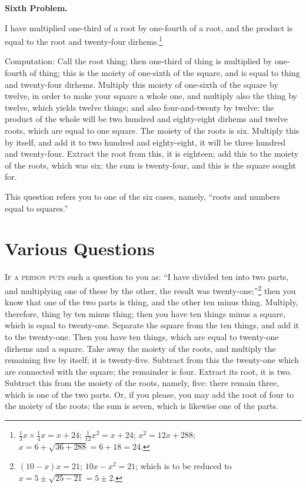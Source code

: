 \vspace{0.3cm}
\noindent\textbf{Sixth Problem.}

I have multiplied one-third of a root by one-fourth of a root, and the product is equal to the root and twenty-four dirhems.\footnote{$\frac{1}{3}x \times \frac{1}{4}x = x + 24$; $\frac{1}{12}x^2 = x + 24$; $x^2 = 12x + 288$; $x = 6 + \sqrt{36 + 288} = 6 + 18 = 24$.}

Computation: Call the root thing; then one-third of thing is multiplied by one-fourth of thing; this is the moiety of one-sixth of the square, and is equal to thing and twenty-four dirhems. Multiply this moiety of one-sixth of the square by twelve, in order to make your square a whole one, and multiply also the thing by twelve, which yields twelve things; and also four-and-twenty by twelve: the product of the whole will be two hundred and eighty-eight dirhems and twelve roots, which are equal to one square. The moiety of the roots is six. Multiply this by itself, and add it to two hundred and eighty-eight, it will be three hundred and twenty-four. Extract the root from this, it is eighteen; add this to the moiety of the roots, which was six; the sum is twenty-four, and this is the square sought for.

This question refers you to one of the six cases, namely, ``roots and numbers equal to squares.''

\clearpage


\section*{Various Questions}

\lettrine{I}{f a person puts} such a question to you as: ``I have divided ten into two parts, and multiplying one of these by the other, the result was twenty-one;''\footnote{$(10-x)x = 21$; $10x - x^2 = 21$; which is to be reduced to $x = 5 \pm \sqrt{25-21} = 5 \pm 2$.} then you know that one of the two parts is thing, and the other ten minus thing. Multiply, therefore, thing by ten minus thing; then you have ten things minus a square, which is equal to twenty-one. Separate the square from the ten things, and add it to the twenty-one. Then you have ten things, which are equal to twenty-one dirhems and a square. Take away the moiety of the roots, and multiply the remaining five by itself; it is twenty-five. Subtract from this the twenty-one which are connected with the square; the remainder is four. Extract its root, it is two. Subtract this from the moiety of the roots, namely, five: there remain three, which is one of the two parts. Or, if you please, you may add the root of four to the moiety of the roots; the sum is seven, which is likewise one of the parts.


